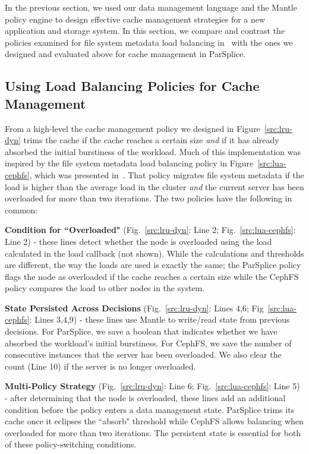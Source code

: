 In the previous section, we used our data management language and the Mantle
policy engine to design effective cache management strategies for a new
application and storage system. In this section, we compare and contrast the
policies examined for file system metadata load balancing
in~\cite{sevilla:sc15-mantle} with the ones we designed and evaluated above for
cache management in ParSplice. 

\subsection{Using Load Balancing Policies for Cache Management}

From a high-level the cache management policy we designed in
Figure~\ref{src:lru-dyn} trims the cache if the cache reaches a certain size
{\it and} if it has already absorbed the initial burstiness of the workload.
Much of this implementation was inspired by the file system metadata load
balancing policy in Figure~\ref{src:lua-cephfs}, which was presented
in~\cite{sevilla:sc15-mantle}. That policy migrates file system metadata if the
load is higher than the average load in the cluster {\it and} the current
server has been overloaded for more than two iterations. The two policies have
the following in common:

\textbf{Condition for ``Overloaded"} (Fig.~\ref{src:lru-dyn}: Line 2;
Fig.~\ref{src:lua-cephfs}: Line 2) - these lines detect whether the node is
overloaded using the load calculated in the load callback (not shown). While
the calculations and thresholds are different, the way the loads are used is
exactly the same; the ParSplice policy flags the node as overloaded if the
cache reaches a certain size while the CephFS policy compares the load to other
nodes in the system.

\textbf{State Persisted Across Decisions} (Fig.~\ref{src:lru-dyn}: Lines 4,6;
Fig~\ref{src:lua-cephfs}: Lines 3,4,9) - these lines use Mantle to write/read state
from previous decisions.  For ParSplice, we save a boolean that indicates
whether we have absorbed the workload's initial burstiness. For CephFS, we save
the number of consecutive instances that the server has been overloaded. We
also clear the count (Line 10) if the server is no longer overloaded. 

\textbf{Multi-Policy Strategy} (Fig.~\ref{src:lru-dyn}: Line 6;
Fig.~\ref{src:lua-cephfs}: Line 5) - after determining that the node is
overloaded, these lines add an additional condition before the policy enters a
data management state.  ParSplice trims its cache once it eclipses the
``absorb" threshold while CephFS allows balancing when overloaded for more than
two iterations. The persistent state is essential for both of these
policy-switching conditions.

